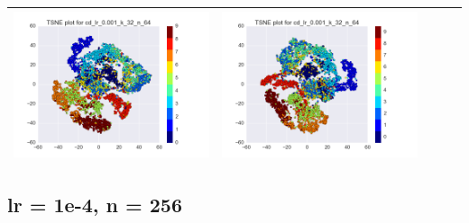 \documentclass[12pt]{report}
\begin{document}
\begin{table}[H]
\begin{tabular}{ | c | c | c | c || c |}
\begin{minipage}{.3\textwidth}
      \includegraphics[scale=0.25]{cd_lr_0_001_k_32_n_64.png}
    \end{minipage} &
    \begin{minipage}{.3\textwidth}
      \includegraphics[scale=0.25]{test_cd_lr_0_001_k_32_n_64.png}
    \end{minipage}
   \\ \hline
  \end{tabular}
\end{table}


\subsection{lr = 1e-4, n = 256}
\end{document}

